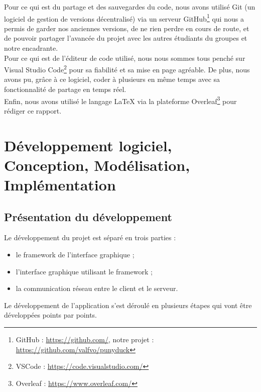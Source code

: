 \documentclass{report}
\begin{document}
Pour ce qui est du partage et des sauvegardes du code, nous avons utilisé Git (un logiciel de gestion de versions décentralisé) via un serveur GitHub\footnote{GitHub : \url{https://github.com/}, notre projet : \url{https://github.com/valfvo/punyduck}} qui nous a permis de garder nos anciennes versions, de ne rien perdre en cours de route, et de pouvoir partager l'avancée du projet avec les autres étudiants du groupes et notre encadrante. \\

Pour ce qui est de l'éditeur de code utilisé, nous nous sommes tous penché sur Visual Studio Code\footnote{VSCode : \url{https://code.visualstudio.com/}} pour sa fiabilité et sa mise en page agréable. De plus, nous avons pu, grâce à ce logiciel, coder à plusieurs en même temps avec sa fonctionnalité de partage en temps réel. \\

Enfin, nous avons utilisé le langage \LaTeX{} via la plateforme Overleaf\footnote{Overleaf : \url{https://www.overleaf.com/}} pour rédiger ce rapport.


\chapter{Développement logiciel, Conception, Modélisation, Implémentation}
\section{Présentation du développement}
Le développement du projet est séparé en trois parties : 
\begin{itemize}[label=$-$, leftmargin=1.5cm]
    \item le framework de l'interface graphique ;
    \item l'interface graphique utilisant le framework ;
    \item la communication réseau entre le client et le serveur.
\end{itemize}

Le développement de l'application s'est déroulé en plusieurs étapes qui vont être développées points par points.
\end{document}
